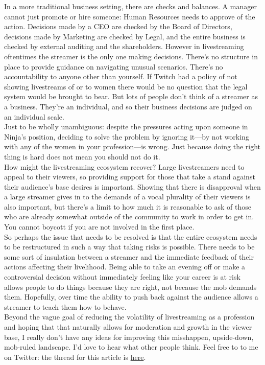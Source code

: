 \documentclass{article}
\begin{document}
In a more traditional business setting, there are checks and balances. A manager cannot just promote or hire someone: Human Resources needs to approve of the action. Decisions made by a CEO are checked by the Board of Directors, decisions made by Marketing are checked by Legal, and the entire business is checked by external auditing and the shareholders. However in livestreaming oftentimes the streamer is the only one making decisions. There's no structure in place to provide guidance on navigating unusual scenarios. There's no accountability to anyone other than yourself. If Twitch had a policy of not showing livestreams of or to women there would be no question that the legal system would be brought to bear. But lots of people don't think of a streamer as a business. They're an individual, and so their business decisions are judged on an individual scale.\\

Just to be wholly unambiguous: despite the pressures acting upon someone in Ninja's position, deciding to solve the problem by ignoring it---by not working with any of the women in your profession---is wrong. Just because doing the right thing is hard does not mean you should not do it.\\

How might the livestreaming ecosystem recover? Large livestreamers need to appeal to their viewers, so providing support for those that take a stand against their audience's base desires is important. Showing that there is disapproval when a large streamer gives in to the demands of a vocal plurality of their viewers is also important, but there's a limit to how much it is reasonable to ask of those who are already somewhat outside of the community to work in order to get in. You cannot boycott if you are not involved in the first place.\\

So perhaps the issue that needs to be resolved is that the entire ecosystem needs to be restructured in such a way that taking risks is possible. There needs to be some sort of insulation between a streamer and the immediate feedback of their actions affecting their livelihood. Being able to take an evening off or make a controversial decision without immediately feeling like your career is at risk allows people to do things because they are right, not because the mob demands them. Hopefully, over time the ability to push back against the audience allows a streamer to teach them how to behave.\\

Beyond the vague goal of reducing the volatility of livestreaming as a profession and hoping that that naturally allows for moderation and growth in the viewer base, I really don't have any ideas for improving this misshappen, upside-down, mob-ruled landscape. I'd love to hear what other people think. Feel free to to me on Twitter: the thread for this article is \href{https://twitter.com/KleeneAlgebraCo}{here}.
\end{document}
